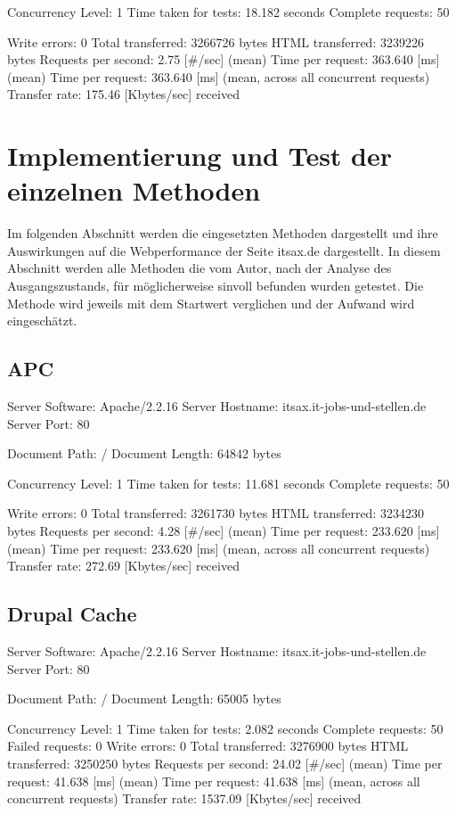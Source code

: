 Concurrency Level:      1
Time taken for tests:   18.182 seconds
Complete requests:      50

Write errors:           0
Total transferred:      3266726 bytes
HTML transferred:       3239226 bytes
Requests per second:    2.75 [\#/sec] (mean)
Time per request:       363.640 [ms] (mean)
Time per request:       363.640 [ms] (mean, across all concurrent requests)
Transfer rate:          175.46 [Kbytes/sec] received



\section{Implementierung und Test der einzelnen Methoden}
Im folgenden Abschnitt werden die eingesetzten Methoden dargestellt und ihre Auswirkungen auf die Webperformance der Seite itsax.de dargestellt. 
In diesem Abschnitt werden alle Methoden die vom Autor, nach der Analyse des Ausgangszustands, für möglicherweise sinvoll befunden wurden getestet. Die Methode wird jeweils mit dem Startwert verglichen und der Aufwand wird eingeschätzt.
\subsection{APC}
Server Software:        Apache/2.2.16
Server Hostname:        itsax.it-jobs-und-stellen.de
Server Port:            80

Document Path:          /
Document Length:        64842 bytes

Concurrency Level:      1
Time taken for tests:   11.681 seconds
Complete requests:      50

Write errors:           0
Total transferred:      3261730 bytes
HTML transferred:       3234230 bytes
Requests per second:    4.28 [\#/sec] (mean)
Time per request:       233.620 [ms] (mean)
Time per request:       233.620 [ms] (mean, across all concurrent requests)
Transfer rate:          272.69 [Kbytes/sec] received

\subsection{Drupal Cache}
Server Software:        Apache/2.2.16
Server Hostname:        itsax.it-jobs-und-stellen.de
Server Port:            80

Document Path:          /
Document Length:        65005 bytes

Concurrency Level:      1
Time taken for tests:   2.082 seconds
Complete requests:      50
Failed requests:        0
Write errors:           0
Total transferred:      3276900 bytes
HTML transferred:       3250250 bytes
Requests per second:    24.02 [\#/sec] (mean)
Time per request:       41.638 [ms] (mean)
Time per request:       41.638 [ms] (mean, across all concurrent requests)
Transfer rate:          1537.09 [Kbytes/sec] received


